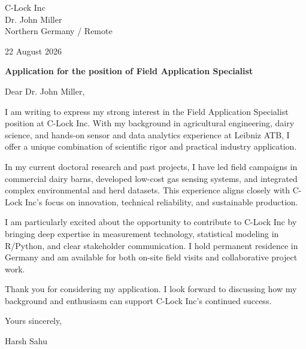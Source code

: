 \documentclass[10pt,a4paper]{article}
\begin{document}

C-Lock Inc\\

Dr. John Miller\\

Northern Germany / Remote

\vspace{10pt}
22 August 2026

\vspace{10pt}
\textbf{Application for the position of Field Application Specialist}


\vspace{8pt}
Dear Dr. John Miller,


I am writing to express my strong interest in the Field Application Specialist position at C-Lock Inc. With my background in agricultural engineering, dairy science, and hands-on sensor and data analytics experience at Leibniz ATB, I offer a unique combination of scientific rigor and practical industry application.

\vspace{4pt}

In my current doctoral research and past projects, I have led field campaigns in commercial dairy barns, developed low-cost gas sensing systems, and integrated complex environmental and herd datasets. This experience aligns closely with C-Lock Inc's focus on innovation, technical reliability, and sustainable production.

\vspace{4pt}

I am particularly excited about the opportunity to contribute to C-Lock Inc by bringing deep expertise in measurement technology, statistical modeling in R/Python, and clear stakeholder communication. I hold permanent residence in Germany and am available for both on-site field visits and collaborative project work.

\vspace{4pt}

Thank you for considering my application. I look forward to discussing how my background and enthusiasm can support C-Lock Inc's continued success.

\vspace{4pt}


Yours sincerely,

\vspace{14pt}
Harsh Sahu
\end{document}
